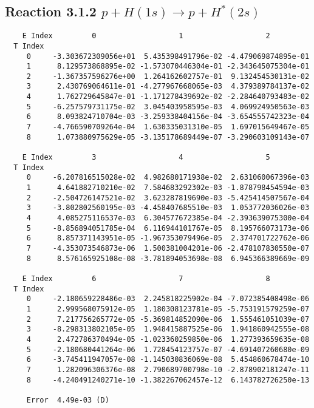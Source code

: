 \documentclass[12pt]{article}
\begin{document}
                              


\newpage
\subsection{
Reaction 3.1.2 $   p + H(1s) \rightarrow p + H^*(2s)$}


\begin{small}\begin{verbatim}
    E Index         0                   1                   2
  T Index
     0     -3.303672309056e+01  5.435398491796e-02 -4.479069874895e-01
     1      8.129573868895e-02 -1.573070446304e-01 -2.343645075304e-01
     2     -1.367357596276e+00  1.264162602757e-01  9.132454530131e-02
     3      2.430769064611e-01 -4.277967668065e-03  4.379389784137e-02
     4      1.762729645847e-01 -1.171278439692e-02 -2.284640793483e-02
     5     -6.257579731175e-02  3.045403958595e-03  4.069924950563e-03
     6      8.093824710704e-03 -3.259338404156e-04 -3.654555742323e-04
     7     -4.766590709264e-04  1.630335031310e-05  1.697015649467e-05
     8      1.073880975629e-05 -3.135178689449e-07 -3.290603109143e-07

    E Index         3                   4                   5
  T Index
     0     -6.207816515028e-02  4.982680171938e-02  2.631060067396e-03
     1      4.641882710210e-02  7.584683292302e-03 -1.878798454594e-03
     2     -2.504726147521e-02  3.623287819690e-03 -5.425414507567e-04
     3     -3.802802560195e-03 -4.458407685510e-03  1.053772036026e-03
     4      4.085275116537e-03  6.304577672385e-04 -2.393639075300e-04
     5     -8.856894051785e-04  6.116944101767e-05  8.195766073173e-06
     6      8.857371143951e-05 -1.967353079496e-05  2.374701722762e-06
     7     -4.353073546873e-06  1.500381004201e-06 -2.478107830550e-07
     8      8.576165925108e-08 -3.781894053698e-08  6.945366389669e-09

    E Index         6                   7                   8
  T Index
     0     -2.180659228486e-03  2.245818225902e-04 -7.072385408498e-06
     1      2.999568075912e-05  1.180308123781e-05 -5.753191579259e-07
     2      7.217756265772e-05 -5.369814852090e-06  1.555461051039e-07
     3     -8.298313802105e-05  1.948415887525e-06  1.941860942555e-08
     4      2.472786370494e-05 -1.023360259850e-06  1.277393659635e-08
     5     -2.180680441264e-06  1.728454123757e-07 -4.691407260680e-09
     6     -3.745411947057e-08 -1.145030836069e-08  5.454860678474e-10
     7      1.282096306376e-08  2.790689700798e-10 -2.878902181247e-11
     8     -4.240491240271e-10 -1.382267062457e-12  6.143782726250e-13

     Error  4.49e-03 (D)
\end{verbatim}\end{small}
\end{document}
